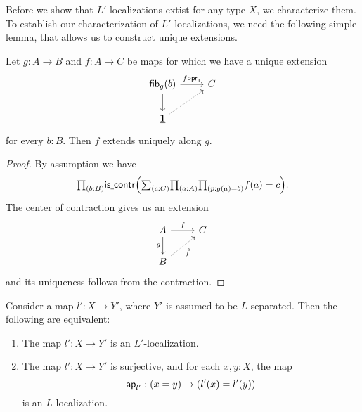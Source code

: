 Before we show that $L'$-localizations extist for any type $X$, we characterize them.
To establish our characterization of $L'$-localizations, we need the following simple lemma, that allows us to construct unique extensions.

\begin{lem}\label{lem:unique_extension}
Let $g:A\to B$ and $f:A\to C$ be maps for which we have a unique extension
\[
  \begin{tikzcd}
    \fib{g}{b} \arrow[r,"f\circ\proj 1"] \arrow[d] & C \\
    \unit \arrow[ur,densely dotted]
  \end{tikzcd}
\]
for every $b:B$.
Then $f$ extends uniquely along $g$.
\end{lem}

\begin{proof}
By assumption we have
\[
  \prd{b:B}\iscontr\Big(\sm{c:C}\prd{a:A}{p:g(a)=b} f(a)=c\Big).
\]
The center of contraction gives us an extension
\[
  \begin{tikzcd}
    A \arrow[r,"f"] \arrow[d,swap,"g"] & C \\
    B \arrow[ur,densely dotted,swap,"\tilde{f}"]
  \end{tikzcd}
\]
and its uniqueness follows from the contraction.
\end{proof}

\begin{thm}\label{thm:separation_characterization}
Consider a map $l':X\to Y'$, where $Y'$ is assumed to be $L$-separated. Then the following are equivalent:
\begin{enumerate}
\item The map $l':X\to Y'$ is an $L'$-localization.
\item The map $l':X\to Y'$ is surjective, and for each $x,y:X$, the map
\begin{equation*}
\mathsf{ap}_{l'}:(x=y)\to (l'(x)=l'(y))
\end{equation*}
is an $L$-localization. 
\end{enumerate}
\end{thm}

